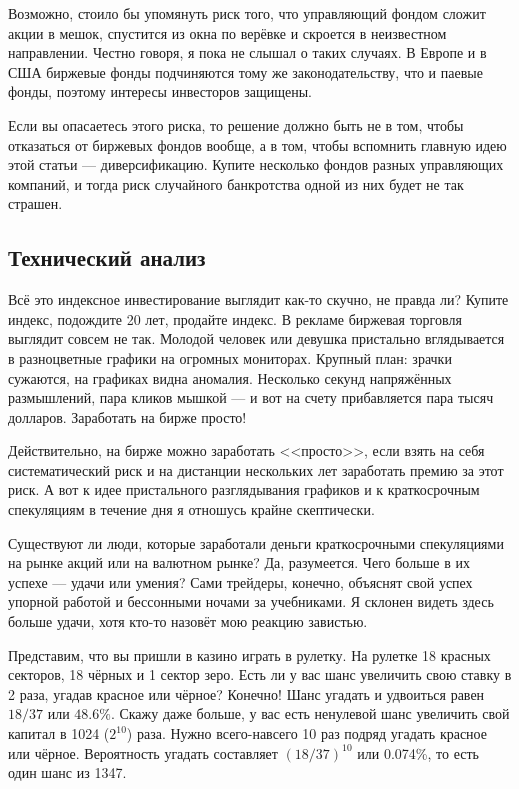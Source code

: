 Возможно, стоило бы упомянуть риск того, что управляющий фондом сложит акции 
в мешок, спустится из окна по верёвке и скроется в неизвестном направлении. 
Честно говоря, я пока не слышал о таких случаях. В Европе и в США биржевые фонды 
подчиняются тому же законодательству, что и паевые фонды, поэтому интересы 
инвесторов защищены. 

Если вы опасаетесь этого риска, то решение должно быть не в том, чтобы  
отказаться от биржевых фондов вообще, а в том, чтобы вспомнить главную идею этой 
статьи --- диверсификацию. Купите несколько фондов разных управляющих компаний, 
и тогда риск случайного банкротства одной из них будет не так страшен.

\subsection{Технический анализ}

Всё это индексное инвестирование выглядит как-то скучно, не правда ли? Купите
индекс, подождите 20 лет, продайте индекс. В рекламе биржевая торговля выглядит
совсем не так. Молодой человек или девушка пристально вглядывается в 
разноцветные графики на огромных мониторах. Крупный план: зрачки сужаются, на 
графиках видна аномалия. Несколько секунд напряжённых размышлений, пара кликов 
мышкой --- и вот на счету прибавляется пара тысяч долларов. Заработать на 
бирже просто!

Действительно, на бирже можно заработать <<просто>>, если взять на себя 
систематический риск и на дистанции нескольких лет заработать премию за этот 
риск. А вот к идее пристального разглядывания графиков и к краткосрочным 
спекуляциям в течение дня я отношусь крайне скептически.

Существуют ли люди, которые заработали деньги краткосрочными спекуляциями на 
рынке акций или на валютном рынке? Да, разумеется. Чего больше в их успехе --- 
удачи или умения? Сами трейдеры, конечно, объяснят свой успех упорной работой и 
бессонными ночами за учебниками. Я склонен видеть здесь больше удачи, хотя 
кто-то назовёт мою реакцию завистью.

Представим, что вы пришли в казино играть в рулетку. На рулетке 18 красных 
секторов, 18 чёрных и 1 сектор зеро. Есть ли у вас шанс увеличить свою ставку в
2 раза, угадав красное или чёрное? Конечно! Шанс угадать и удвоиться равен 
$18/37$ или $48.6\%$. Скажу даже больше, у вас есть ненулевой шанс увеличить 
свой капитал в 1024 ($2^{10}$) раза. Нужно всего-навсего 10 раз подряд угадать 
красное или чёрное. Вероятность угадать составляет $(18/37)^{10}$ или 0.074\%, 
то есть один шанс из 1347.

